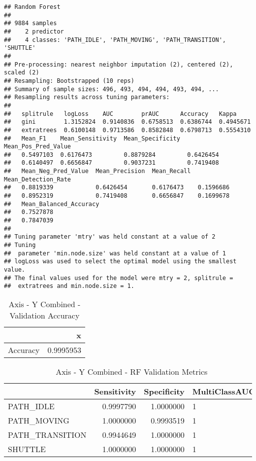 \documentclass[]{article}
\begin{document}
\begin{verbatim}
## Random Forest 
## 
## 9884 samples
##    2 predictor
##    4 classes: 'PATH_IDLE', 'PATH_MOVING', 'PATH_TRANSITION', 'SHUTTLE' 
## 
## Pre-processing: nearest neighbor imputation (2), centered (2), scaled (2) 
## Resampling: Bootstrapped (10 reps) 
## Summary of sample sizes: 496, 493, 494, 494, 493, 494, ... 
## Resampling results across tuning parameters:
## 
##   splitrule   logLoss    AUC        prAUC      Accuracy   Kappa    
##   gini        1.3152824  0.9140836  0.6758513  0.6386744  0.4945671
##   extratrees  0.6100148  0.9713586  0.8582848  0.6798713  0.5554310
##   Mean_F1    Mean_Sensitivity  Mean_Specificity  Mean_Pos_Pred_Value
##   0.5497103  0.6176473         0.8879284         0.6426454          
##   0.6140497  0.6656847         0.9037231         0.7419408          
##   Mean_Neg_Pred_Value  Mean_Precision  Mean_Recall  Mean_Detection_Rate
##   0.8819339            0.6426454       0.6176473    0.1596686          
##   0.8952319            0.7419408       0.6656847    0.1699678          
##   Mean_Balanced_Accuracy
##   0.7527878             
##   0.7847039             
## 
## Tuning parameter 'mtry' was held constant at a value of 2
## Tuning
##  parameter 'min.node.size' was held constant at a value of 1
## logLoss was used to select the optimal model using the smallest value.
## The final values used for the model were mtry = 2, splitrule =
##  extratrees and min.node.size = 1.
\end{verbatim}

\begin{table}[!h]

\caption{\label{tab:sensor-y-combined-rf-results}Axis - Y Combined - Validation Accuracy}
\centering
\begin{tabular}[t]{lr}
\toprule
  & x\\
\midrule
Accuracy & 0.9995953\\
\bottomrule
\end{tabular}
\end{table}

\begin{table}[!h]

\caption{\label{tab:sensor-y-combined-rf-results}Axis - Y Combined - RF Validation Metrics}
\centering
\begin{tabular}[t]{lrrl}
\toprule
  & Sensitivity & Specificity & MultiClassAUC\\
\midrule
PATH\_IDLE & 0.9997790 & 1.0000000 & 1\\
PATH\_MOVING & 1.0000000 & 0.9993519 & 1\\
PATH\_TRANSITION & 0.9944649 & 1.0000000 & 1\\
SHUTTLE & 1.0000000 & 1.0000000 & 1\\
\bottomrule
\end{tabular}
\end{table}
\end{document}
